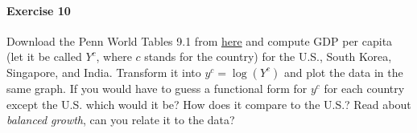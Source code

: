 \documentclass[a4paper,11pt]{article}
\theoremstyle{definition}
\theoremstyle{plain}
\begin{document}
\paragraph{Exercise 10}\label{exercise-10}

Download the Penn World Tables 9.1 from \href{https://www.rug.nl/ggdc/productivity/pwt/}{here} and compute GDP per capita (let it be called $Y^c$, where $c$ stands for the country) for the U.S., South Korea, Singapore, and India. Transform it into $y^c = \log(Y^c)$ and plot the data in the same graph. If you would have to guess a functional form for $y^c$ for each country except the U.S. which would it be? How does it compare to the U.S.? Read about \textit{balanced growth}, can you relate it to the data?
\end{document}
